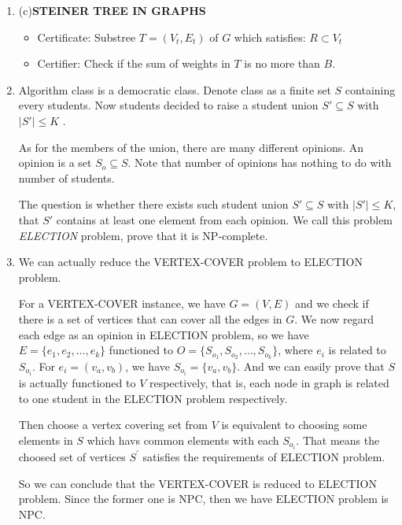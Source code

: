 \documentclass[12pt,a4paper]{article}
\makeatletter
\newtheorem*{solution}{Solution}
\theoremstyle{definition}
\renewenvironment{solution}[1][Solution] {\par\pushQED{\qed}\normalfont\topsep6\p@\@plus6\p@\relax\trivlist\item[\hskip\labelsep\bfseries#1\@addpunct{.}]\ignorespaces}{\popQED\endtrivlist\@endpefalse} \makeatother
\makeatother
\begin{document}
\begin{enumerate}
\begin{solution}
		(c)\textbf{STEINER TREE IN GRAPHS}
		\begin{itemize}
			\item Certificate: Substree $T=(V_t, E_t)$ of $G$ which satisfies: $R \subset V_t$
			\item Certifier: Check if the sum of weights in $T$ is no more than $B$.
		\end{itemize}


    \end{solution}

	\item Algorithm class is a democratic class. Denote class as a finite set $S$ containing every students. Now students decided to raise a student union $S' \subseteq S$ with $|S'|\leq K$ .
	
	As for the members of the union, there are many different opinions. An opinion is a set $S_o\subseteq S$. Note that number of opinions has nothing to do with number of students.
	
	The question is whether there exists such student union $S' \subseteq S$ with $|S'|\leq K$, that $S'$ contains at least one element from each opinion. We call this problem \emph{ELECTION} problem, prove that it is NP-complete.
	
	\begin{solution}
		We can actually reduce the VERTEX-COVER problem to ELECTION problem.
		
		For a VERTEX-COVER instance, we have $G=(V,E)$ and we check if there is a set of vertices that can cover all the edges in $G$. 
	We now regard each edge as an opinion in ELECTION problem, so we have $E=\{e_1, e_2, ..., e_k\}$ functioned to $O = \{S_{o_1}, S_{o_2}, ..., S_{o_k}\}$, where $e_i$ is related to $S_{o_i}$.
	For $e_i = (v_a, v_b)$, we have $S_{o_i} = \{v_a, v_b\}$.  And we can easily prove that $S$ is actually functioned to $V$ respectively, that is, each node in graph is related to one student in the ELECTION problem respectively.

	 Then choose a vertex covering set from $V$ is equivalent to choosing some elements in $S$ which havs common elements with each $S_{o_i}$. That means the choosed set of vertices $S^{'}$ 
	 satisfies the requirements of ELECTION problem.

	 So we can conclude that the VERTEX-COVER is reduced to ELECTION problem. Since the former one is NPC, then we have ELECTION problem is  NPC.
	


    \end{solution}


\end{enumerate}
\end{document}
